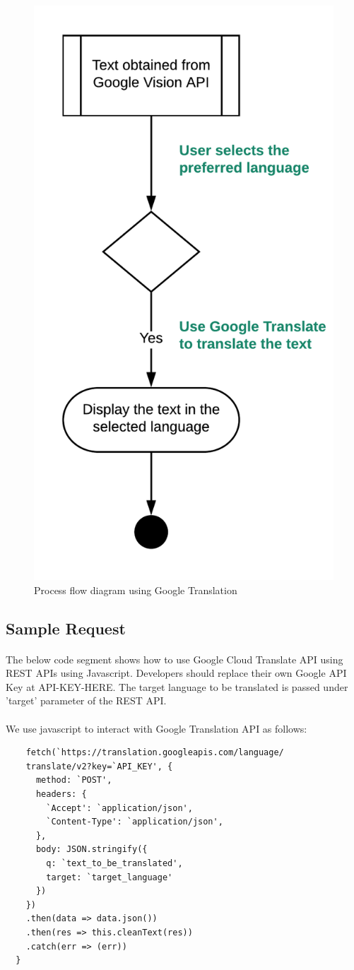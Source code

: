 \documentclass[12pt]{article}
\begin{document}
\begin{figure}[H]
	\centering
	\includegraphics[width=0.5\linewidth]{media/Translate.png}
	\caption{Process flow diagram using Google Translation}
	\label{fig:translate_uml}
\end{figure} 

\subsection{Sample Request}

\paragraph{}The below code segment shows how to use Google Cloud Translate API using REST APIs using Javascript. Developers should replace their own Google API Key at  API-KEY-HERE. The target language to be translated is passed under 'target' parameter of the REST API. 

\paragraph{}We use javascript to interact with Google Translation API as follows:

\begin{lstlisting}
    fetch(`https://translation.googleapis.com/language/
    translate/v2?key=`API_KEY', {
      method: `POST',
      headers: {
        `Accept': `application/json',
        `Content-Type': `application/json',
      },
      body: JSON.stringify({
        q: `text_to_be_translated',
        target: `target_language'
      })
    })
    .then(data => data.json())
    .then(res => this.cleanText(res))
    .catch(err => (err))
  }
\end{lstlisting}
\end{document}
